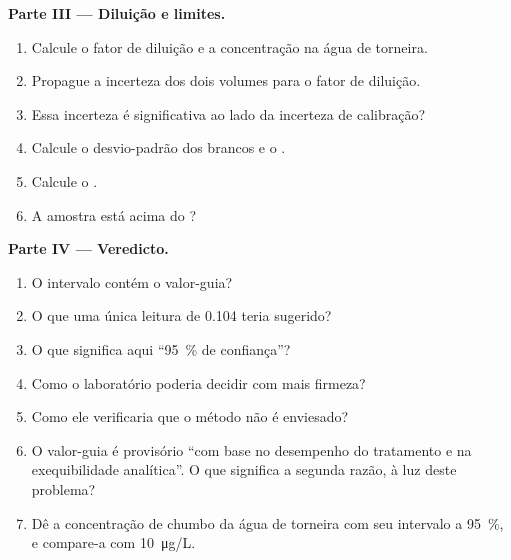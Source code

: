 \begin{problem}
\medskip
\noindent\textbf{Parte III --- Diluição e limites.}
\begin{enumerate}[resume]
  \item Calcule o fator de diluição e a concentração na água de torneira.
  \item Propague a incerteza dos dois volumes para o fator de diluição.
  \item Essa incerteza é significativa ao lado da incerteza de calibração?
  \item Calcule o desvio-padrão dos brancos e o .
  \item Calcule o .
  \item A amostra está acima do ?
\end{enumerate}

\medskip
\noindent\textbf{Parte IV --- Veredicto.}
\begin{enumerate}[resume]
  \item O intervalo contém o valor-guia?
  \item O que uma única leitura de 0.104 teria sugerido?
  \item O que significa aqui ``95~\% de confiança''?
  \item Como o laboratório poderia decidir com mais firmeza?
  \item Como ele verificaria que o método não é enviesado?
  \item O valor-guia é provisório ``com base no desempenho do tratamento e na exequibilidade
        analítica''. O que significa a segunda razão, à luz deste problema?
  \item Dê a concentração de chumbo da água de torneira com seu intervalo a 95~\%, e compare-a com
        \qty{10}{\micro g/L}.
\end{enumerate}
\end{problem}
